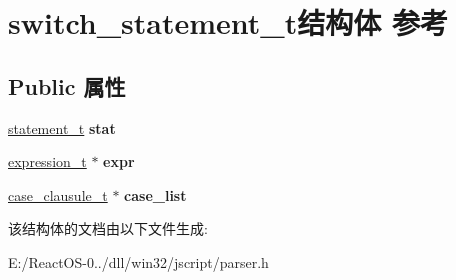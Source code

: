 \hypertarget{structswitch__statement__t}{}\section{switch\+\_\+statement\+\_\+t结构体 参考}
\label{structswitch__statement__t}
\subsection*{Public 属性}
\begin{DoxyCompactItemize}
\item 
\mbox{\label{structswitch__statement__t_ade007bc30c9f73a72c0939a500c093e0}} 
\hyperlink{struct__statement__t}{statement\+\_\+t} {\bfseries stat}
\item 
\mbox{\label{structswitch__statement__t_a173cebc3875c8bc9c4827228202e29ca}} 
\hyperlink{struct__expression__t}{expression\+\_\+t} $\ast$ {\bfseries expr}
\item 
\mbox{\label{structswitch__statement__t_ac18dec5c35a47e2c1db57f39b6fa2f1a}} 
\hyperlink{struct__case__clausule__t}{case\+\_\+clausule\+\_\+t} $\ast$ {\bfseries case\+\_\+list}
\end{DoxyCompactItemize}


该结构体的文档由以下文件生成\+:\begin{DoxyCompactItemize}
\item 
E\+:/\+React\+O\+S-\/0../dll/win32/jscript/parser.\+h\end{DoxyCompactItemize}
